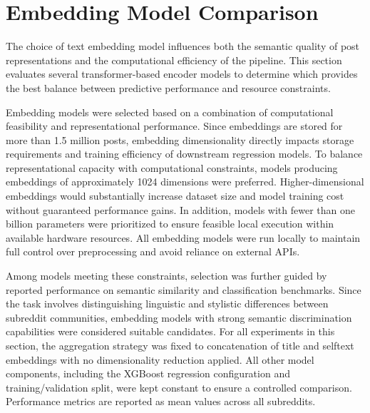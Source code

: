 \section{Embedding Model Comparison}

The choice of text embedding model influences both the semantic quality of post representations and the computational efficiency of the pipeline. This section evaluates several transformer-based encoder models to determine which provides the best balance between predictive performance and resource constraints.

Embedding models were selected based on a combination of computational feasibility and representational performance. Since embeddings are stored for more than 1.5 million posts, embedding dimensionality directly impacts storage requirements and training efficiency of downstream regression models. To balance representational capacity with computational constraints, models producing embeddings of approximately 1024 dimensions were preferred. Higher-dimensional embeddings would substantially increase dataset size and model training cost without guaranteed performance gains. In addition, models with fewer than one billion parameters were prioritized to ensure feasible local execution within available hardware resources. All embedding models were run locally to maintain full control over preprocessing and avoid reliance on external APIs.

Among models meeting these constraints, selection was further guided by reported performance on semantic similarity and classification benchmarks. Since the task involves distinguishing linguistic and stylistic differences between subreddit communities, embedding models with strong semantic discrimination capabilities were considered suitable candidates. For all experiments in this section, the aggregation strategy was fixed to concatenation of title and selftext embeddings with no dimensionality reduction applied. All other model components, including the XGBoost regression configuration and training/validation split, were kept constant to ensure a controlled comparison. Performance metrics are reported as mean values across all subreddits.

